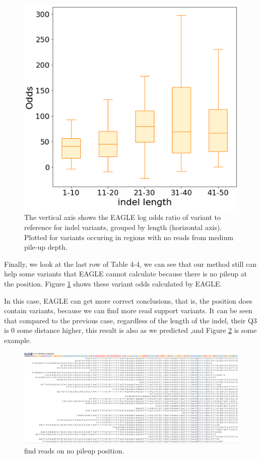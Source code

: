\vspace{0.5cm}
\begin{figure}[H]
    \centering
    \includegraphics[width=0.6\columnwidth]{body/image/4-11.png}
    \captionsetup{labelfont=bf}
    \renewcommand{\baselinestretch}{1.0}
    \caption[no reads with variants from medium pile-up depth odds ratio]{The vertical axis shows the EAGLE log odds ratio of variant to reference for indel variants, grouped by length (horizontal axis).  Plotted for variants occuring in regions with no reads from medium pile-up depth.}
    \label{f4-11}
\end{figure}


Finally, we look at the last row of Table 4-4, we can see that our method still can help some variants that EAGLE cannot calculate because there is no pileup at the position. Figure \ref{f4-11} shows these variant odds calculated by EAGLE.

In this case, EAGLE can get more correct conclusions, that is, the position does contain variants, because we can find more read support variants. It can be seen that compared to the previous case, regardless of the length of the indel, their Q3 is 0 some distance higher, this result is also as we predicted ,and Figure \ref{f4-12} is some example.

\vspace{1cm}
\begin{figure}[H]
    \centering
    \includegraphics[width=1\columnwidth]{body/image/4-12.png}
    \captionsetup{labelfont=bf}
    \renewcommand{\baselinestretch}{1.0}
    \vspace{-1cm}
    \caption[find new pileup reads in medium pile-up read depth]{find reads on no pileup position.}
    \label{f4-12}
\end{figure}

